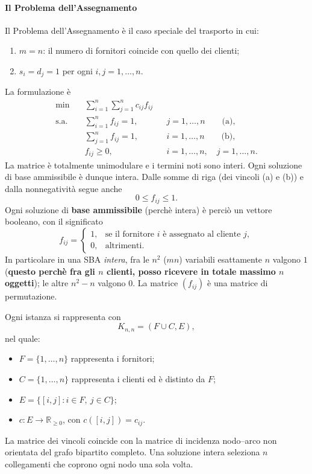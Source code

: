 \paragraph{Il Problema dell'Assegnamento}
\label{ex:assegnamento}
Il Problema dell'Assegnamento è il caso speciale del trasporto in cui:
\begin{enumerate}
\item[i.] \(m=n\): il numero di fornitori coincide con quello dei clienti;
\item[ii.] \(s_i=d_j=1\) per ogni \(i,j=1,\ldots,n\).
\end{enumerate}
La formulazione è
\begin{align*}
\min\quad &\sum_{i=1}^n\sum_{j=1}^n c_{ij}f_{ij}\\
\text{s.a.}\quad
&\sum_{i=1}^n f_{ij}=1,
&&j=1,\ldots,n \qquad\text{(a)},\\
&\sum_{j=1}^n f_{ij}=1,
&&i=1,\ldots,n \qquad\text{(b)},\\
&f_{ij}\geq0,
&&i=1,\ldots,n,\quad j=1,\ldots,n.
\end{align*}
La matrice è totalmente unimodulare e i termini noti
sono interi. Ogni soluzione di base ammissibile è dunque intera.
Dalle somme di riga (dei vincoli (a) e (b)) e dalla nonnegatività segue anche
\[
0\leq f_{ij}\leq1.
\]
Ogni soluzione di\textbf{ base ammissibile} (perchè intera) è perciò un vettore booleano,
con il significato
\[
f_{ij}=
\begin{cases}
1,&\text{se il fornitore \(i\) è assegnato al cliente \(j\)},\\
0,&\text{altrimenti}.
\end{cases}
\]
In particolare in una SBA \emph{intera}, fra le \(n^2\) ($mn$)
variabili esattamente \(n\) valgono \(1\) (\textbf{questo perchè fra gli $n$ clienti, posso ricevere in totale massimo $n$ oggetti}); le altre \(n^2-n\) valgono \(0\).
La matrice \((f_{ij})\) è una matrice di permutazione.

Ogni istanza si rappresenta con
\[
K_{n,n}=(F\cup C,E),
\]
nel quale:
\begin{itemize}
\item \(F=\{1,\ldots,n\}\) rappresenta i fornitori;
\item \(C=\{1,\ldots,n\}\) rappresenta i clienti ed è distinto da \(F\);
\item \(E=\{[i,j]:i\in F,\ j\in C\}\);
\item \(c:E\longrightarrow\mathbb R_{\geq0}\), con \(c([i,j])=c_{ij}\).
\end{itemize}
La matrice dei vincoli coincide con la matrice di incidenza
nodo--arco non orientata del grafo bipartito completo.
Una soluzione intera seleziona \(n\) collegamenti
che coprono ogni nodo una sola volta.

